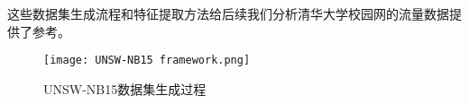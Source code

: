 这些数据集生成流程和特征提取方法给后续我们分析清华大学校园网的流量数据提供了参考。


\begin{figure}
    \centering
    \texttt{[image: UNSW-NB15 framework.png]}
    \caption{UNSW-NB15数据集生成过程}
    \label{fig:UNSW-NB15数据集生成过程}
  \end{figure}



